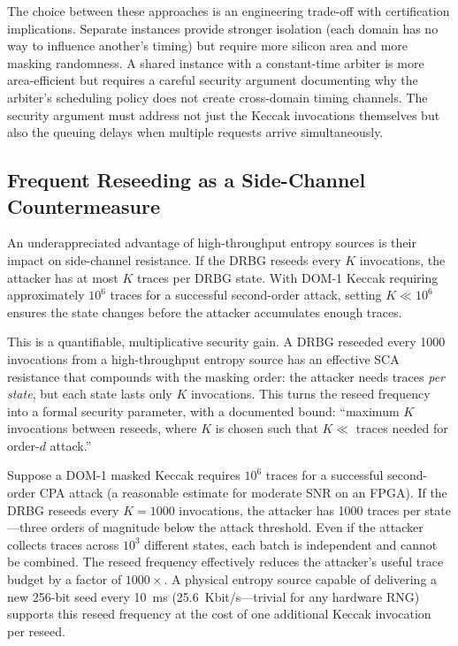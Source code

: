 The choice between these approaches is an engineering trade-off with certification implications.  Separate instances provide stronger isolation (each domain has no way to influence another's timing) but require more silicon area and more masking randomness.  A shared instance with a constant-time arbiter is more area-efficient but requires a careful security argument documenting why the arbiter's scheduling policy does not create cross-domain timing channels.  The security argument must address not just the Keccak invocations themselves but also the queuing delays when multiple requests arrive simultaneously.

\subsection{Frequent Reseeding as a Side-Channel Countermeasure}
\label{subsec:reseed-sca}

An underappreciated advantage of high-throughput entropy sources is their impact on side-channel resistance.  If the DRBG reseeds every $K$ invocations, the attacker has at most $K$ traces per DRBG state.  With DOM-1 Keccak requiring approximately $10^6$ traces for a successful second-order attack, setting $K \ll 10^6$ ensures the state changes before the attacker accumulates enough traces.

This is a quantifiable, multiplicative security gain.  A DRBG reseeded every 1000 invocations from a high-throughput entropy source has an effective SCA resistance that compounds with the masking order: the attacker needs traces \emph{per state}, but each state lasts only $K$ invocations.  This turns the reseed frequency into a formal security parameter, with a documented bound: ``maximum $K$ invocations between reseeds, where $K$ is chosen such that $K \ll$ traces needed for order-$d$ attack.''

\begin{example}
\label{ex:reseed-frequency}
Suppose a DOM-1 masked Keccak requires $10^6$ traces for a successful second-order CPA attack (a reasonable estimate for moderate SNR on an FPGA).  If the DRBG reseeds every $K = 1000$ invocations, the attacker has 1000 traces per state---three orders of magnitude below the attack threshold.  Even if the attacker collects traces across $10^3$ different states, each batch is independent and cannot be combined.  The reseed frequency effectively reduces the attacker's useful trace budget by a factor of $1000\times$.  A physical entropy source capable of delivering a new 256-bit seed every 10~ms (25.6~Kbit/s---trivial for any hardware RNG) supports this reseed frequency at the cost of one additional Keccak invocation per reseed.
\end{example}

